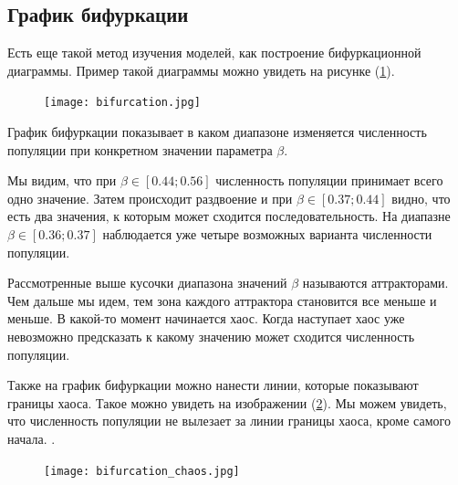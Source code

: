    \subsection{График бифуркации}

        Есть еще такой метод изучения моделей, как построение бифуркационной диаграммы. Пример такой диаграммы можно увидеть на рисунке (\ref{bifurcation}).

        \begin{figure}
            \centering
            \texttt{[image: bifurcation.jpg]}

            \captionsetup{justification=centering}
            \caption{}
            \label{bifurcation}
        \end{figure}

        График бифуркации показывает в каком диапазоне изменяется численность популяции при конкретном значении параметра \(\beta\).

        Мы видим, что при \(\beta \in [0.44; 0.56]\) численность популяции принимает всего одно значение. Затем происходит раздвоение и при \(\beta \in [0.37; 0.44]\) видно, что есть два значения, к которым может сходится последовательность. На диапазне \(\beta \in [0.36; 0.37]\) наблюдается уже четыре возможных варианта численности популяции. 
        
        Рассмотренные выше кусочки диапазона значений \(\beta\) называются аттракторами. Чем дальше мы идем, тем зона каждого аттрактора становится все меньше и меньше. В какой-то момент начинается хаос. Когда наступает хаос уже невозможно предсказать к какому значению может сходится численность популяции.




        Также на график бифуркации можно нанести линии, которые показывают границы хаоса. Такое можно увидеть на изображении (\ref{bifurcation_chaos}). Мы можем увидеть, что численность популяции не вылезает за линии границы хаоса, кроме самого начала. .

        \begin{figure}
            \centering
            \texttt{[image: bifurcation\_chaos.jpg]}

            \captionsetup{justification=centering}
            \caption{}
            \label{bifurcation_chaos}
        \end{figure}

